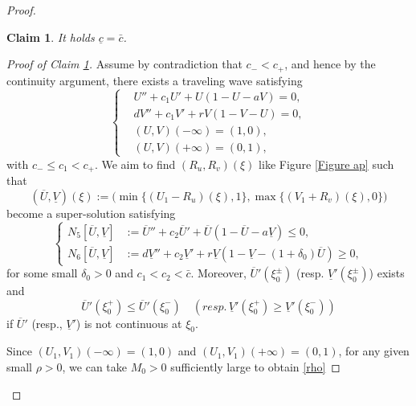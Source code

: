\documentclass[11pt,a4paper]{article}
\newtheorem{claim}[theorem]{\textbf{Claim}}
\numberwithin{equation}{section}
\numberwithin{figure}{section}
\begin{document}
\begin{proof}
\begin{claim}\label{claim 2 AP}
It holds $\underline c=\bar c$.
\end{claim}
\begin{proof}[Proof of Claim \ref{claim 2 AP}]
Assume by contradiction that $c_-<c_+$, and hence by the continuity argument, there exists a traveling wave satisfying 
 \begin{equation}\label{traveling wave c1}
    \left\{
        \begin{aligned}
        &U''+c_1U'+U(1-U-aV)=0,\\
        &dV''+c_1V'+rV(1-V-U)=0,\\
        &(U,V)(-\infty)=(1,0),\\
        &(U,V)(+\infty)=(0,1),
        \end{aligned}
        \right.
    \end{equation}
with $c_-\le c_1<c_+$. We aim to find $(R_u,R_v)(\xi)$ like Figure \ref{Figure ap} such that 
$$(\overline U,\underline{V})(\xi):=\Big(\min\{(U_1-R_u)(\xi),1\},\max\{(V_1+R_v)(\xi),0\}\Big)$$ become a super-solution 
satisfying
\begin{equation}\label{def: super solution 2}
\left\{
\begin{aligned}
N_5[\overline U,\underline V]&:=\overline U''+c_2\overline U'+\overline U(1-\overline U-a\underline V)\le 0,\\
N_6[\overline U,\underline V]&:=d\underline V''+c_2\underline V'+r\underline V(1-\underline V-(1+\delta_0)\overline U)\ge 0,
\end{aligned}
\right.
\end{equation}
for some small $\delta_0>0$ and $c_1<c_2<\bar c$.
Moreover,
$\overline U'(\xi_0^{\pm})$
(resp. $\underline V'(\xi_0^{\pm})$) exists and 
\begin{equation*}
\overline U'(\xi_0^+)\leq \overline U'(\xi_0^-)\quad (resp.\, \underline V'(\xi_0^+)\geq \underline V'(\xi_0^-)) 
\end{equation*}
if  $\overline U'$ (resp., $\underline V'$) is not continuous at $\xi_0$.




Since 
$(U_1,V_1)(-\infty)=(1,0)$ and
$(U_1,V_1)(+\infty)=(0,1)$, for any given small $\rho>0$, we can take $M_0>0$ sufficiently large to obtain \eqref{rho}


\end{proof}
\end{proof}
\end{document}
